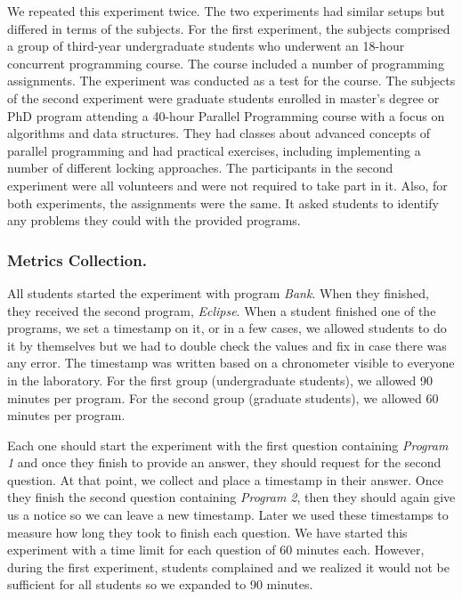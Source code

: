 We repeated this experiment twice.
The two experiments had similar setups but differed in terms of the subjects. For the first experiment, the subjects comprised a group of third-year undergraduate students who underwent an 18-hour concurrent programming course. The course included a number of programming assignments. The experiment was conducted as a test for the course. The subjects of the second experiment were  graduate students enrolled in master's degree or PhD program attending a 40-hour Parallel Programming course with a focus on algorithms and data structures. They had classes about advanced concepts of parallel programming and had practical exercises, including implementing a number of different locking approaches. The participants in the second experiment were all volunteers and were not required to take part in it. Also, for both experiments, the assignments were the same. It asked students to identify any problems they could with the provided programs.


\subsubsection{Metrics Collection.}

All students started the experiment with program \emph{Bank}. When they finished, they received the second program, \emph{Eclipse}. When a student finished one of the programs, we set a timestamp on it, or in a few cases, we allowed students to do it by themselves but we had to double check the values and fix in case there was any error. The timestamp was written based on a chronometer visible to everyone in the laboratory. For the first group (undergraduate students), we allowed 90 minutes per program. For the second group (graduate students), we allowed 60 minutes per program. 

Each one should start the experiment with the first question containing \emph{Program 1} and once they finish to provide an answer, they should request for the second question. At that point, we collect and place a timestamp in their answer. Once they finish the second question containing \emph{Program 2}, then they should again give us a notice so we can leave a new timestamp. Later we used these timestamps to measure how long they took to finish each question. We have started this experiment with a time limit for each question of 60 minutes each. However, during the first experiment, students complained and we realized it would not be sufficient for all students so we expanded to 90 minutes.

